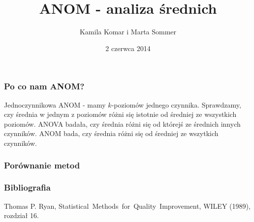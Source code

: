 \documentclass[11pt,usenames,dvipsnames,svgnames,x11names]{beamer}
\date{2 czerwca 2014}
\author{Kamila Komar i Marta Sommer}
\title{ANOM - analiza średnich}
\theoremstyle{plain}
\theoremstyle{definition}
\theoremstyle{remark}
\begin{document}
\begin{frame}   
\titlepage
\end{frame}


\begin{frame}
\frametitle{Po co nam ANOM?}
Jednoczynnikowa ANOM - mamy $k$-poziomów jednego czynnika. Sprawdzamy, czy średnia w jednym z poziomów różni się istotnie od średniej ze wszystkich poziomów. ANOVA badała, czy średnia różni się od którejś ze średnich innych czynników. ANOM bada, czy średnia różni się od średniej ze wszytkich czynników.  
\end{frame}


\begin{frame}
\frametitle{Porównanie metod}
\end{frame}

\begin{frame}
\frametitle{Bibliografia}
\begin{thebibliography}{9}
 Thomas P. Ryan, Statistical~Methods~for~Quality~Improvement, WILEY (1989), rozdział 16.
\end{thebibliography}
\end{frame}
\end{document}
